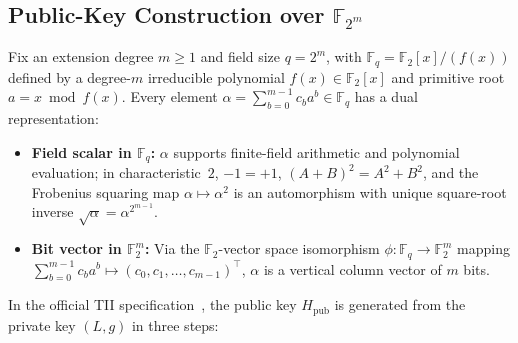 \documentclass[11pt,a4paper]{article}
\theoremstyle{definition}
\theoremstyle{remark}
\newcommand{\F}{\mathbb{F}}
\begin{document}
\subsection{Public-Key Construction over \texorpdfstring{$\F_{2^m}$}{F\_\{2\^m\}}}
Fix an extension degree $m \ge 1$ and field size $q = 2^m$, with $\F_q = \F_2[x]/(f(x))$ defined by a degree-$m$ irreducible polynomial $f(x) \in \F_2[x]$ and primitive root $a = x \bmod f(x)$. Every element $\alpha = \sum_{b=0}^{m-1} c_b a^b \in \F_q$ has a dual representation:
\begin{itemize}[leftmargin=1.5em]
    \item \textbf{Field scalar in $\F_q$:} $\alpha$ supports finite-field arithmetic and polynomial evaluation; in characteristic~$2$, $-1 = +1$, $(A + B)^2 = A^2 + B^2$, and the Frobenius squaring map $\alpha \mapsto \alpha^2$ is an automorphism with unique square-root inverse $\sqrt{\alpha} = \alpha^{2^{m-1}}$.
    \item \textbf{Bit vector in $\F_2^m$:} Via the $\F_2$-vector space isomorphism $\phi: \F_q \to \F_2^m$ mapping $\sum_{b=0}^{m-1} c_b a^b \mapsto (c_0, c_1, \dots, c_{m-1})^\top$, $\alpha$ is a vertical column vector of $m$ bits.
\end{itemize}

In the official TII specification~\cite{KE23}, the public key $H_{\text{pub}}$ is generated from the private key $(L, g)$ in three steps:
\end{document}
